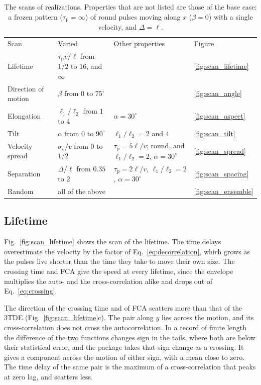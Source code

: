 \documentclass[aps,pre,11pt,a4paper,preprint,amsmath,amssymb,groupedaddress]{revtex4-2}
\newcommand{\Eqref}[1]{Eq.~\eqref{#1}}
\newcommand{\Figref}[1]{Fig.~\ref{#1}}
\newcommand{\taud}{\ensuremath{\tau_\text{p}}}
\begin{document}
\begin{table}
\caption{The scans of realizations. Properties that are not listed are those of the base case: a frozen pattern ($\taud = \infty$) of round pulses moving along $x$ ($\beta = 0$) with a single velocity, and $\Delta = \ell$.}
\label{tab:scans}
\begin{ruledtabular}
\begin{tabular}{llll}
Scan & Varied & Other properties & Figure \\
\colrule
Lifetime & $\taud v/\ell$ from $1/2$ to $16$, and $\infty$ & & \ref{fig:scan_lifetime} \\
Direction of motion & $\beta$ from $0$ to $75^\circ$ & & \ref{fig:scan_angle} \\
Elongation & $\ell_1/\ell_2$ from $1$ to $4$ & $\alpha = 30^\circ$ & \ref{fig:scan_aspect} \\
Tilt & $\alpha$ from $0$ to $90^\circ$ & $\ell_1/\ell_2 = 2$ and $4$ & \ref{fig:scan_tilt} \\
Velocity spread & $\sigma_v/v$ from $0$ to $1/2$ & $\taud = 5\ell/v$; round, and $\ell_1/\ell_2 = 2$, $\alpha = 30^\circ$ & \ref{fig:scan_spread} \\
Separation & $\Delta/\ell$ from $0.35$ to $2$ & $\taud = 2\ell/v$, $\ell_1/\ell_2 = 2$, $\alpha = 30^\circ$ & \ref{fig:scan_spacing} \\
Random & all of the above & & \ref{fig:scan_ensemble} \\
\end{tabular}
\end{ruledtabular}
\end{table}

\subsection{Lifetime}

\Figref{fig:scan_lifetime} shows the scan of the lifetime. The time delays overestimate the velocity by the factor of \Eqref{eq:decorrelation}, which grows as the pulses live shorter than the time they take to move their own size. The crossing time and FCA give the speed at every lifetime, since the envelope multiplies the auto- and the cross-correlation alike and drops out of \Eqref{eq:crossing}.

The direction of the crossing time and of FCA scatters more than that of the 3TDE (\Figref{fig:scan_lifetime}c). The pair along $y$ lies across the motion, and its cross-correlation does not cross the autocorrelation. In a record of finite length the difference of the two functions changes sign in the tails, where both are below their statistical error, and the package takes that sign change as a crossing. It gives a component across the motion of either sign, with a mean close to zero. The time delay of the same pair is the maximum of a cross-correlation that peaks at zero lag, and scatters less.
\end{document}

